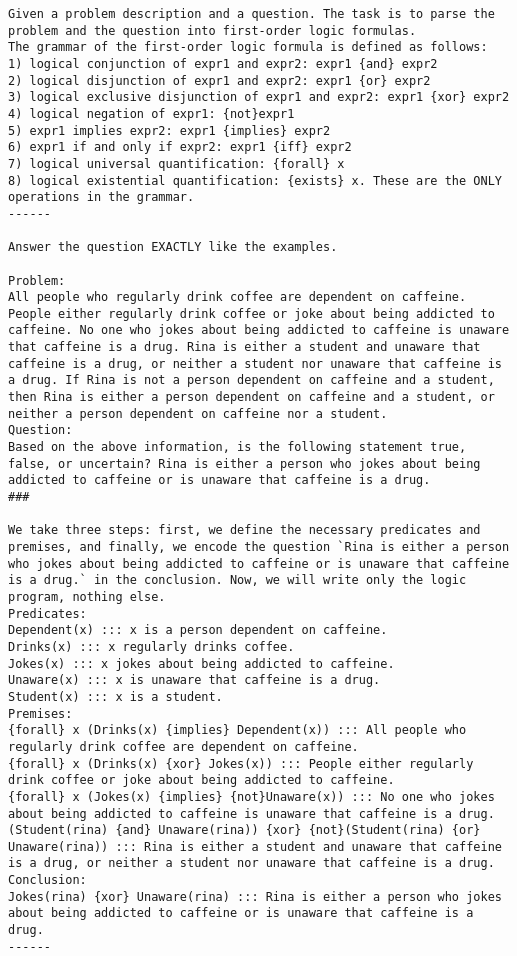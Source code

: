 \begin{lstlisting}[style=myGrammarStyle, caption=Prompt Template Used For FOLIO Evaluation]
Given a problem description and a question. The task is to parse the problem and the question into first-order logic formulas.
The grammar of the first-order logic formula is defined as follows:
1) logical conjunction of expr1 and expr2: expr1 {and} expr2
2) logical disjunction of expr1 and expr2: expr1 {or} expr2
3) logical exclusive disjunction of expr1 and expr2: expr1 {xor} expr2
4) logical negation of expr1: {not}expr1
5) expr1 implies expr2: expr1 {implies} expr2
6) expr1 if and only if expr2: expr1 {iff} expr2
7) logical universal quantification: {forall} x
8) logical existential quantification: {exists} x. These are the ONLY operations in the grammar.
------

Answer the question EXACTLY like the examples.

Problem:
All people who regularly drink coffee are dependent on caffeine. People either regularly drink coffee or joke about being addicted to caffeine. No one who jokes about being addicted to caffeine is unaware that caffeine is a drug. Rina is either a student and unaware that caffeine is a drug, or neither a student nor unaware that caffeine is a drug. If Rina is not a person dependent on caffeine and a student, then Rina is either a person dependent on caffeine and a student, or neither a person dependent on caffeine nor a student.
Question:
Based on the above information, is the following statement true, false, or uncertain? Rina is either a person who jokes about being addicted to caffeine or is unaware that caffeine is a drug.
###

We take three steps: first, we define the necessary predicates and premises, and finally, we encode the question `Rina is either a person who jokes about being addicted to caffeine or is unaware that caffeine is a drug.` in the conclusion. Now, we will write only the logic program, nothing else.
Predicates:
Dependent(x) ::: x is a person dependent on caffeine.
Drinks(x) ::: x regularly drinks coffee.
Jokes(x) ::: x jokes about being addicted to caffeine.
Unaware(x) ::: x is unaware that caffeine is a drug.
Student(x) ::: x is a student.
Premises:
{forall} x (Drinks(x) {implies} Dependent(x)) ::: All people who regularly drink coffee are dependent on caffeine.
{forall} x (Drinks(x) {xor} Jokes(x)) ::: People either regularly drink coffee or joke about being addicted to caffeine.
{forall} x (Jokes(x) {implies} {not}Unaware(x)) ::: No one who jokes about being addicted to caffeine is unaware that caffeine is a drug. 
(Student(rina) {and} Unaware(rina)) {xor} {not}(Student(rina) {or} Unaware(rina)) ::: Rina is either a student and unaware that caffeine is a drug, or neither a student nor unaware that caffeine is a drug.
Conclusion:
Jokes(rina) {xor} Unaware(rina) ::: Rina is either a person who jokes about being addicted to caffeine or is unaware that caffeine is a drug.
------


\end{lstlisting}
